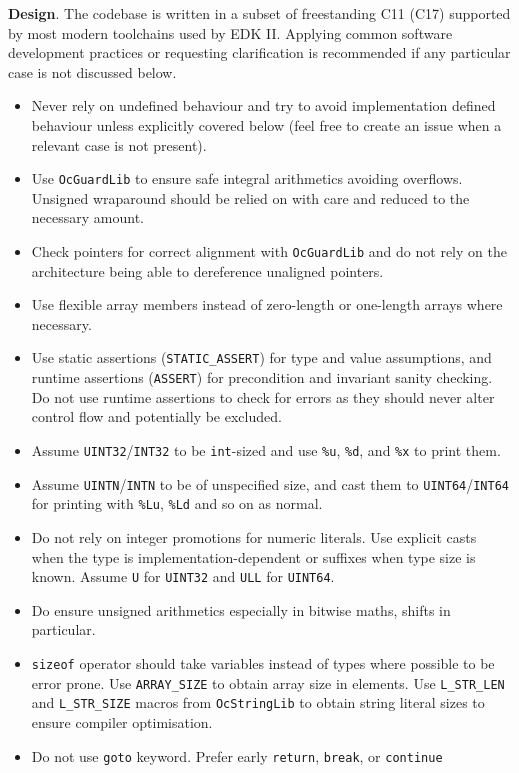 \documentclass[]{article}
\providecommand{\tightlist}{%
  \setlength{\itemsep}{0pt}\setlength{\parskip}{0pt}}
\begin{document}
\textbf{Design}. The codebase is written in a subset of freestanding C11 (C17) supported by
most modern toolchains used by EDK II. Applying common software development practices or requesting
clarification is recommended if any particular case is not discussed below.
\begin{itemize}
\tightlist
\item Never rely on undefined behaviour and try to avoid implementation defined behaviour unless
explicitly covered below (feel free to create an issue when a relevant case is not present).
\item Use \texttt{OcGuardLib} to ensure safe integral arithmetics avoiding overflows. Unsigned
wraparound should be relied on with care and reduced to the necessary amount.
\item Check pointers for correct alignment with \texttt{OcGuardLib} and do not rely on the architecture
being able to dereference unaligned pointers.
\item Use flexible array members instead of zero-length or one-length arrays where necessary.
\item Use static assertions (\texttt{STATIC\_ASSERT}) for type and value assumptions, and runtime
assertions (\texttt{ASSERT}) for precondition and invariant sanity checking. Do not use runtime
assertions to check for errors as they should never alter control flow and potentially be excluded.
\item Assume \texttt{UINT32}/\texttt{INT32} to be \texttt{int}-sized and use \texttt{\%u},
\texttt{\%d}, and \texttt{\%x} to print them.
\item Assume \texttt{UINTN}/\texttt{INTN} to be of unspecified size, and cast them to
\texttt{UINT64}/\texttt{INT64} for printing with \texttt{\%Lu}, \texttt{\%Ld} and so on as normal.
\item Do not rely on integer promotions for numeric literals. Use explicit casts when the type is
implementation-dependent or suffixes when type size is known. Assume \texttt{U} for \texttt{UINT32}
and \texttt{ULL} for \texttt{UINT64}.
\item Do ensure unsigned arithmetics especially in bitwise maths, shifts in particular.
\item \texttt{sizeof} operator should take variables instead of types where possible to be error prone.
Use \texttt{ARRAY\_SIZE} to obtain array size in elements. Use \texttt{L\_STR\_LEN} and
\texttt{L\_STR\_SIZE} macros from \texttt{OcStringLib} to obtain string literal sizes to ensure compiler
optimisation.
\item Do not use \texttt{goto} keyword. Prefer early \texttt{return}, \texttt{break}, or \texttt{continue}

\end{itemize}
\end{document}
